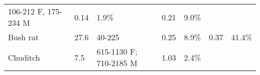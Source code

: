 \documentclass[version=last,
    paper=a4,                               %
    10pt,                                   %
    dvipsnames,
    oneside,                              %
    headings=openany,                       %
    open=any,
    BCOR=7mm,                               %
    DIV=15,     %
]{scrbook}
\begin{document}
\begin{longtable}[c]{@{}lllllll@{}}
\begin{minipage}[t]{0.12\columnwidth}
106-212 F, 175-234 M
\end{minipage} & \begin{minipage}[t]{0.12\columnwidth}\raggedright
0.14
\end{minipage} & \begin{minipage}[t]{0.12\columnwidth}\raggedright
1.9\%
\end{minipage} & \begin{minipage}[t]{0.12\columnwidth}\raggedright
0.21
\end{minipage} & \begin{minipage}[t]{0.12\columnwidth}\raggedright
9.0\%
\end{minipage}
\\\addlinespace
\begin{minipage}[t]{0.12\columnwidth}\raggedright
Bush rat
\end{minipage} & \begin{minipage}[t]{0.12\columnwidth}\raggedright
27.6
\end{minipage} & \begin{minipage}[t]{0.12\columnwidth}\raggedright
40-225
\end{minipage} & \begin{minipage}[t]{0.12\columnwidth}\raggedright
0.25
\end{minipage} & \begin{minipage}[t]{0.12\columnwidth}\raggedright
8.9\%
\end{minipage} & \begin{minipage}[t]{0.12\columnwidth}\raggedright
0.37
\end{minipage} & \begin{minipage}[t]{0.12\columnwidth}\raggedright
41.4\%
\end{minipage}
\\\addlinespace
\begin{minipage}[t]{0.12\columnwidth}\raggedright
Chuditch
\end{minipage} & \begin{minipage}[t]{0.12\columnwidth}\raggedright
7.5
\end{minipage} & \begin{minipage}[t]{0.12\columnwidth}\raggedright
615-1130 F; 710-2185 M
\end{minipage} & \begin{minipage}[t]{0.12\columnwidth}\raggedright
1.03
\end{minipage} & \begin{minipage}[t]{0.12\columnwidth}\raggedright
2.4\%
\end{minipage} & \begin{minipage}[t]{0.12\columnwidth}\raggedright

\end{minipage}
\end{longtable}
\end{document}
